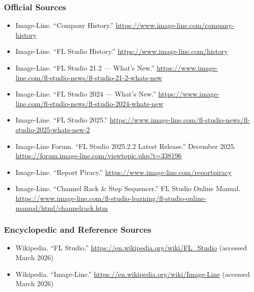 \documentclass[11pt,letterpaper]{article}
\begin{document}
\subsubsection{Official Sources}
\begin{itemize}[noitemsep]
  \item Image-Line. ``Company History.'' \url{https://www.image-line.com/company-history}
  \item Image-Line. ``FL Studio History.'' \url{https://www.image-line.com/history}
  \item Image-Line. ``FL Studio 21.2 --- What's New.'' \url{https://www.image-line.com/fl-studio-news/fl-studio-21-2-whats-new}
  \item Image-Line. ``FL Studio 2024 --- What's New.'' \url{https://www.image-line.com/fl-studio-news/fl-studio-2024-whats-new}
  \item Image-Line. ``FL Studio 2025.'' \url{https://www.image-line.com/fl-studio-news/fl-studio-2025-whats-new-2}
  \item Image-Line Forum. ``FL Studio 2025.2.2 Latest Release.'' December 2025. \url{https://forum.image-line.com/viewtopic.php?t=338196}
  \item Image-Line. ``Report Piracy.'' \url{https://www.image-line.com/reportpiracy}
  \item Image-Line. ``Channel Rack \& Step Sequencer.'' FL Studio Online Manual. \url{https://www.image-line.com/fl-studio-learning/fl-studio-online-manual/html/channelrack.htm}
\end{itemize}

\subsubsection{Encyclopedic and Reference Sources}
\begin{itemize}[noitemsep]
  \item Wikipedia. ``FL Studio.'' \url{https://en.wikipedia.org/wiki/FL_Studio} (accessed March 2026)
  \item Wikipedia. ``Image-Line.'' \url{https://en.wikipedia.org/wiki/Image-Line} (accessed March 2026)
\end{itemize}
\end{document}
